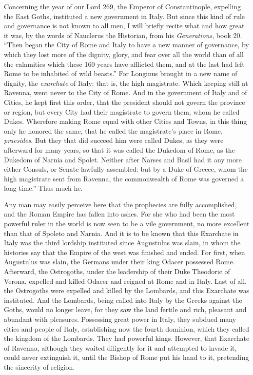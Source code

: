 Concerning the year of our Lord 269, the Emperor of Constantinople, expelling the East Goths, instituted a new government in Italy. But since this kind of rule and governance is not known to all men, I will briefly recite what and how great it was, by the words of Nauclerus the Historian, from his \textit{Generations}, book 20. “Then began the City of Rome and Italy to have a new manner of governance, by which they lost more of the dignity, glory, and fear over all the world than of all the calamities which these 160 years have afflicted them, and at the last had left Rome to be inhabited of wild beasts.” For Longinus brought in a new name of dignity, the \textit{exarchate} of Italy: that is, the high magistrate. Which keeping still at Ravenna, went never to the City of Rome. And in the government of Italy and of Cities, he kept first this order, that the president should not govern the province or region, but every City had their magistrate to govern them, whom he called Dukes. Wherefore making Rome equal with other Cities and Towns, in this thing only he honored the same, that he called the magistrate’s place in Rome, \textit{praesides}. But they that did succeed him were called Dukes, as they were afterward for many years, so that it was called the Dukedom of Rome, as the Dukedom of Narnia and Spolet. Neither after Narses and Basil had it any more either Consuls, or Senate lawfully assembled: but by a Duke of Greece, whom the high magistrate sent from Ravenna, the commonwealth of Rome was governed a long time.” Thus much he.

Any man may easily perceive here that the prophecies are fully accomplished, and the Roman Empire has fallen into ashes. For she who had been the most powerful ruler in the world is now seen to be a vile government, no more excellent than that of Spoleto and Narnia. And it is to be known that this Exarchate in Italy was the third lordship instituted since Augustulus was slain, in whom the histories say that the Empire of the west was finished and ended. For first, when Augustulus was slain, the Germans under their king Odacer possessed Rome. Afterward, the Ostrogoths, under the leadership of their Duke Theodoric of Verona, expelled and killed Odacer and reigned at Rome and in Italy. Last of all, the Ostrogoths were expelled and killed by the Lombards, and this Exarchate was instituted. And the Lombards, being called into Italy by the Greeks against the Goths, would no longer leave, for they saw the land fertile and rich, pleasant and abundant with pleasures. Possessing great power in Italy, they subdued many cities and people of Italy, establishing now the fourth dominion, which they called the kingdom of the Lombards. They had powerful kings. However, that Exarchate of Ravenna, although they waited diligently for it and attempted to invade it, could never extinguish it, until the Bishop of Rome put his hand to it, pretending the sincerity of religion.


